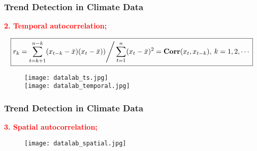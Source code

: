 \documentclass[11pt]{beamer}
\begin{document}
\begin{frame}[fragile]
  \frametitle{\normalsize{\textbf{
    Trend Detection in Climate Data
  }}} 

  \scriptsize{  

    \textbf{\textcolor{red}{
      2. Temporal autocorrelation;
    }}

    \begin{equation*}
      \boxed{
        r_k = 
        \displaystyle\sum_{t=k+1}^{n-k} (x_{t-k} - \bar{x})(x_t - \bar{x})) 
        \Bigg/
        \displaystyle\sum_{t=1}^{n} (x_t - \bar{x})^2 = 
        \text{\textbf{Corr}} (x_t, x_{t-k}), \: k=1,2, \cdots
      }
    \end{equation*}    

    \begin{figure}[h!]
      \centering
      \texttt{[image: datalab\_ts.jpg]} \\
      \texttt{[image: datalab\_temporal.jpg]}
    \end{figure}

  }
\end{frame}

\begin{frame}[fragile]
  \frametitle{\normalsize{\textbf{
    Trend Detection in Climate Data
  }}} 

  \scriptsize{  

    \textbf{\textcolor{red}{
      3. Spatial autocorrelation;
    }}

    \begin{figure}[h!]
      \centering
      \texttt{[image: datalab\_spatial.jpg]} \\
    \end{figure}

  }
\end{frame}
\end{document}
